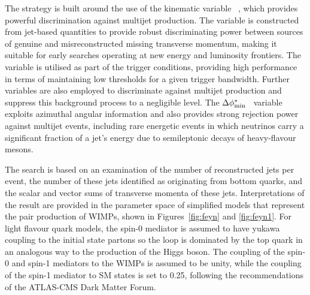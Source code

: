 The strategy is built around the use of the kinematic variable
\alphat~\cite{Randall:2008rw, RA1Paper}, which provides powerful
discrimination against multijet production. The \alphat variable is
constructed from jet-based quantities to provide robust discriminating
power between sources of genuine and misreconstructed missing
transverse momentum, making it suitable for early searches operating
at new energy and luminosity frontiers. The \alphat variable is
utilised as part of the trigger conditions, providing high performance
in terms of maintaining low thresholds for a given trigger
bandwidth. Further variables are also employed to discriminate against
multijet production and suppress this background process to a
negligible level. The $\Delta\phi^{*}_{\rm min}$~\cite{RA1Paper}
variable exploits azimuthal angular information and also provides
strong rejection power against multijet events, including rare
energetic events in which neutrinos carry a significant fraction of a
jet's energy due to semileptonic decays of heavy-flavour mesons.


The search is based on an examination of the number of reconstructed
jets per event, the number of these jets identified as originating
from bottom quarks, and the scalar and vector sums of transverse
momenta of these jets. 
Interpretations of the result are provided in the parameter space of simplified
models that represent the
pair production of WIMPs, shown in Figures~\ref{fig:feyn} and \ref{fig:feyn1}.
For light flavour quark models, the spin-0 mediator is assumed to have yukawa coupling to the initial state partons so the loop is dominated by the top quark in an analogous way to the production of the Higgs boson. The coupling of the spin-0 and spin-1 mediators to the WIMPs is assumed to be unity, while the coupling of the spin-1 mediator to SM states is set to 0.25, following the recommendations of the ATLAS-CMS Dark Matter Forum. 

